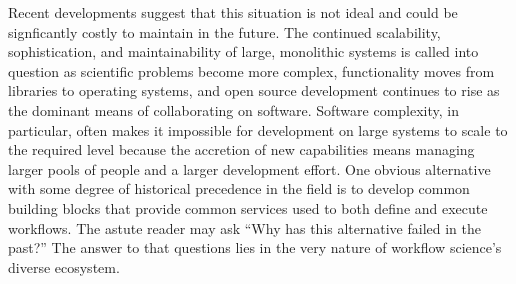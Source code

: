 Recent developments suggest that this situation is not ideal and could be
signficantly costly to maintain in the future. The continued scalability,
sophistication, and maintainability of large, monolithic systems is called into
question as scientific problems become more complex, functionality moves from
libraries to operating systems, and open source development continues to rise
as the dominant means of collaborating on software. Software complexity, in
particular, often makes it impossible for development on large systems to scale
to the required level because the accretion of new capabilities means managing
larger pools of people and a larger development effort. One obvious
alternative with some degree of historical precedence in the field is to
develop common building blocks that provide common services used to both define
and execute workflows. The astute reader may ask ``Why has this alternative
failed in the past?'' The answer to that questions lies in the very nature of
workflow science's diverse ecosystem. 

